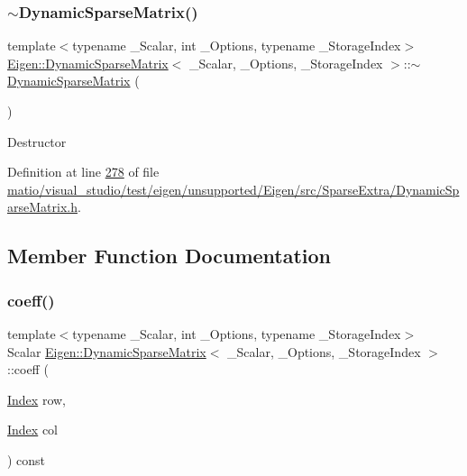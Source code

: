\subsubsection{\texorpdfstring{$\sim$\+Dynamic\+Sparse\+Matrix()}{~DynamicSparseMatrix()}\hspace{0.1cm}{\footnotesize\ttfamily [2/2]}}
{\footnotesize\ttfamily template$<$typename \+\_\+\+Scalar, int \+\_\+\+Options, typename \+\_\+\+Storage\+Index$>$ \\
\hyperlink{class_eigen_1_1_dynamic_sparse_matrix}{Eigen\+::\+Dynamic\+Sparse\+Matrix}$<$ \+\_\+\+Scalar, \+\_\+\+Options, \+\_\+\+Storage\+Index $>$\+::$\sim$\hyperlink{class_eigen_1_1_dynamic_sparse_matrix}{Dynamic\+Sparse\+Matrix} (\begin{DoxyParamCaption}{ }\end{DoxyParamCaption})\hspace{0.3cm}{\ttfamily [inline]}}

Destructor 

Definition at line \hyperlink{matio_2visual__studio_2test_2eigen_2unsupported_2_eigen_2src_2_sparse_extra_2_dynamic_sparse_matrix_8h_source_l00278}{278} of file \hyperlink{matio_2visual__studio_2test_2eigen_2unsupported_2_eigen_2src_2_sparse_extra_2_dynamic_sparse_matrix_8h_source}{matio/visual\+\_\+studio/test/eigen/unsupported/\+Eigen/src/\+Sparse\+Extra/\+Dynamic\+Sparse\+Matrix.\+h}.



\subsection{Member Function Documentation}
\mbox{\label{class_eigen_1_1_dynamic_sparse_matrix_a64b7d586c6b212dbe912a9ee05c3a85a}} 
\subsubsection{\texorpdfstring{coeff()}{coeff()}\hspace{0.1cm}{\footnotesize\ttfamily [1/2]}}
{\footnotesize\ttfamily template$<$typename \+\_\+\+Scalar, int \+\_\+\+Options, typename \+\_\+\+Storage\+Index$>$ \\
Scalar \hyperlink{class_eigen_1_1_dynamic_sparse_matrix}{Eigen\+::\+Dynamic\+Sparse\+Matrix}$<$ \+\_\+\+Scalar, \+\_\+\+Options, \+\_\+\+Storage\+Index $>$\+::coeff (\begin{DoxyParamCaption}\item[{\hyperlink{group___core___module_a554f30542cc2316add4b1ea0a492ff02}{Index}}]{row,  }\item[{\hyperlink{group___core___module_a554f30542cc2316add4b1ea0a492ff02}{Index}}]{col }\end{DoxyParamCaption}) const\hspace{0.3cm}{\ttfamily [inline]}}

